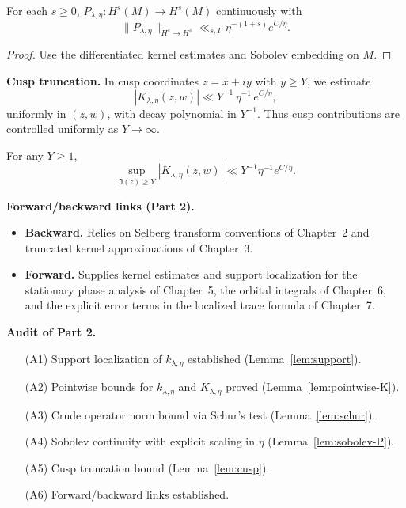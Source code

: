 \begin{lemma}
\label{lem:sobolev-P}
For each $s\ge 0$, $P_{\lambda,\eta}:H^s(M)\to H^s(M)$ continuously with
\[
  \|P_{\lambda,\eta}\|_{H^s\to H^s}
  \ll_{s,\Gamma}\eta^{-(1+s)}e^{C/\eta}.
\]
\end{lemma}

\begin{proof}
Use the differentiated kernel estimates and Sobolev embedding on $M$.
\end{proof}

\medskip
\noindent\textbf{Cusp truncation.}
In cusp coordinates $z=x+iy$ with $y\ge Y$, we estimate
\[
  |K_{\lambda,\eta}(z,w)| \ll Y^{-1}\,\eta^{-1}\,e^{C/\eta},
\]
uniformly in $(z,w)$, with decay polynomial in $Y^{-1}$.
Thus cusp contributions are controlled uniformly as $Y\to\infty$.

\begin{lemma}
\label{lem:cusp}
For any $Y\ge 1$,
\[
  \sup_{\Im(z)\ge Y}|K_{\lambda,\eta}(z,w)|
  \ll Y^{-1}\eta^{-1}e^{C/\eta}.
\]
\end{lemma}

\medskip
\noindent\textbf{Forward/backward links (Part 2).}
\begin{itemize}
  \item \textbf{Backward.} Relies on Selberg transform conventions of Chapter~2
  and truncated kernel approximations of Chapter~3.
  \item \textbf{Forward.} Supplies kernel estimates and support localization
  for the stationary phase analysis of Chapter~5, the orbital integrals of Chapter~6,
  and the explicit error terms in the localized trace formula of Chapter~7.
\end{itemize}

\medskip
\noindent\textbf{Audit of Part 2.}
\begin{itemize}
  \item[(A1)] Support localization of $k_{\lambda,\eta}$ established (Lemma~\ref{lem:support}).
  \item[(A2)] Pointwise bounds for $k_{\lambda,\eta}$ and $K_{\lambda,\eta}$ proved (Lemma~\ref{lem:pointwise-K}).
  \item[(A3)] Crude operator norm bound via Schur’s test (Lemma~\ref{lem:schur}).
  \item[(A4)] Sobolev continuity with explicit scaling in $\eta$ (Lemma~\ref{lem:sobolev-P}).
  \item[(A5)] Cusp truncation bound (Lemma~\ref{lem:cusp}).
  \item[(A6)] Forward/backward links established.
\end{itemize}

